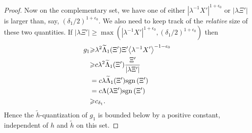 \documentclass[twoside, final]{amsart}
\theoremstyle{definition}
\numberwithin{equation}{section}
\begin{document}
\begin{proof}
Now on the complementary set, we have one of either $|
\lambda^{-1} X'|^{1 + \epsilon_0}$ or $| \lambda \Xi' |$ is larger than, say,
$(\delta_1/2)^{1 + \epsilon_0}$.  We also need to keep track of the {\it relative} size
of these two quantities.  
If ${{\left\lvert{{\lambda \Xi'}}\right\rvert}}{\geqslant}
 \max\left( {{\left\lvert{{ \lambda^{-1} X'}}\right\rvert}}^{1+{{\epsilon}}_0}, (\delta_1/2)^{1 +
     \epsilon_0} \right)$
then
\begin{align}
g_1 & {\geqslant} \lambda^2 {\widetilde{\Lambda}}_1( \Xi') \Xi' {{\left\langle{{ \lambda^{-1} X'
}}\right\rangle}}^{-1-{{\epsilon}}_0} \notag \\
& {\geqslant} c\lambda^2 {\widetilde{\Lambda}}_1( \Xi') \frac{ \Xi'}{ {{\left\lvert{{\lambda \Xi'}}\right\rvert}}}
\notag \\
& = c\lambda {\widetilde{\Lambda}}_1 (\Xi') {\mathrm{sgn}\,} (\Xi') \notag \\
& = c \Lambda ( \lambda \Xi'  ) {\mathrm{sgn}\,} ( \Xi' ) \notag \\
& {\geqslant} c_{\delta_1}. \label{E:g1-2}
\end{align}
Hence the ${\tilde{h}}$-quantization of $g_1$ is bounded below by a positive
constant, independent of $h$ and ${\tilde{h}}$ on this set.


\end{proof}
\end{document}
